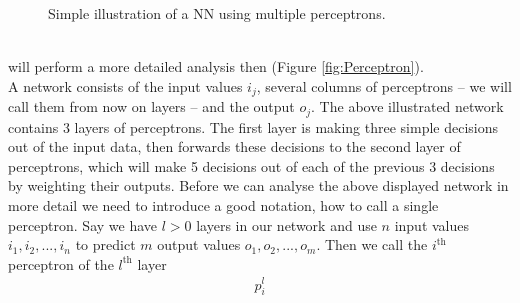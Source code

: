 \documentclass[10pt]{book}
\begin{document}
    \begin{figure}[h]
        \begin{center}
        \end{center}
        \caption{Simple illustration of a NN using multiple perceptrons.\label{fig:simpleNN}}
    \end{figure}\\
    will perform a more detailed analysis then (Figure \ref{fig:Perceptron}).\\
    A network consists of the input values \(i_j\), several columns of perceptrons – we will call them from now on layers – and the output \(o_j\).
    The above illustrated network contains 3 layers of perceptrons. The first layer is making three simple decisions out of the input data,
    then forwards these decisions to the second layer of perceptrons, which will make 5 decisions out of each of the previous 3 decisions by weighting their
    outputs. Before we can analyse the above displayed network in more detail we need to introduce a good notation, how to call a single perceptron.
    Say we have \(l > 0\) layers in our network and use \(n\) input values \(i_1, i_2, ..., i_n\) to predict \(m\) output values \(o_1, o_2, ..., o_m\).
    Then we call the \(i^{\text{th}}\) perceptron of the \(l^{\text{th}}\) layer
    \begin{align}
        p_i^l
    \end{align}
    
\end{document}
